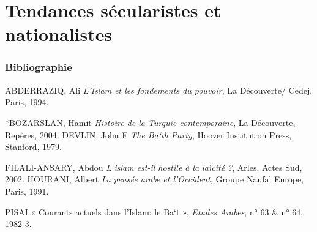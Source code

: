 
  \chapter{{Tendances sécularistes et nationalistes}}
 
 \subsection{Bibliographie}
 
  ABDERRAZIQ, Ali \emph{L'Islam et les fondements du pouvoir}, La
  Découverte/ Cedej, Paris, 1994.
 
*BOZARSLAN, Hamit \emph{Histoire de la Turquie contemporaine}, La
Découverte, Repères, 2004. DEVLIN, John F \emph{The Ba`th Party}, Hoover
Institution Press, Stanford, 1979.

FILALI-ANSARY, Abdou \emph{L'islam est-il hostile à la laïcité ?},
Arles, Actes Sud, 2002. HOURANI, Albert \emph{La pensée arabe et
l'Occident,} Groupe Naufal Europe, Paris, 1991.

PISAI « Courants actuels dans l'Islam: le Ba`t », \emph{Etudes Arabes},
n° 63 \& n° 64, 1982-3.
 


